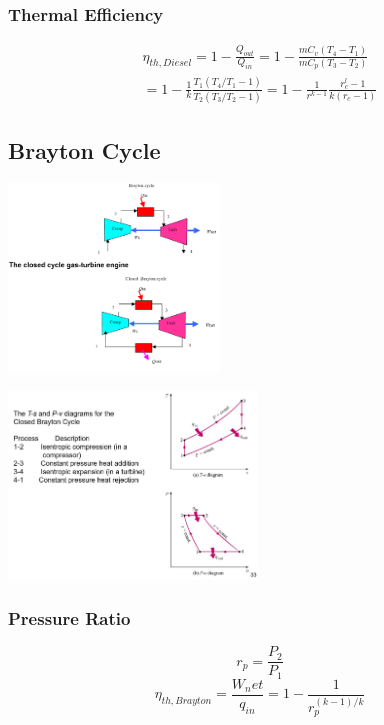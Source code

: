 \documentclass[10pt,landscape]{article}
\newenvironment{Figure}
     {\par\medskip\noindent\minipage{\linewidth}}
     {\endminipage\par\medskip}
\begin{document}
\begin{multicols}{3}
\subsubsection{Thermal Efficiency}
\begin{equation}
    \begin{split}
        \eta_{th,Diesel}=1-\frac{Q_{out}}{Q_{in}}=1-\frac{mC_v(T_4-T_1)}{mC_p(T_3-T_2)}\\
        =1-\frac{1}{k}\frac{T_1(T_4/T_1-1)}{T_2(T_3/T_2-1)}=1-\frac{1}{r^{k-1}}\frac{r^l_c-1}{k(r_c-1)}
    \end{split}
\end{equation}

\subsection{Brayton Cycle}
\begin{Figure}
    \centering
    \includegraphics[width=\linewidth, height=5cm]{ClosedCycle_GasTurbineEngine.png}
\end{Figure}
\begin{Figure}
    \centering
    \includegraphics[width=\linewidth, height=5cm]{BraytonCycleClosed_PVTS.png}
\end{Figure}
\subsubsection{Pressure Ratio}
\begin{equation}
    r_p=\frac{P_2}{P_1}
\end{equation}
\begin{equation}
    \eta_{th,Brayton}=\frac{W_net}{q_{in}}=1-\frac{1}{r_p^{(k-1)/k}}
\end{equation}

\end{multicols}
\end{document}
